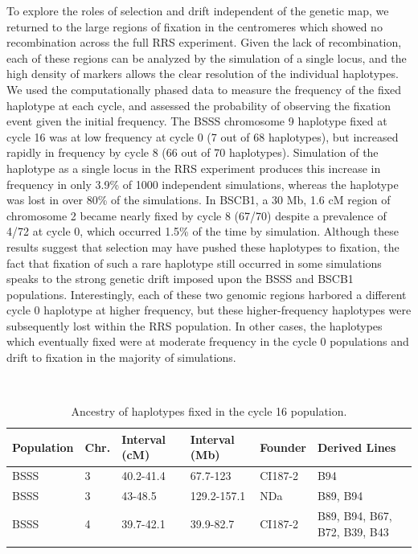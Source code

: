 To explore the roles of selection and drift independent of the genetic map, we returned to the large regions of fixation in the centromeres which showed no recombination across the full RRS experiment. 
Given the lack of recombination, each of these regions can be analyzed by the simulation of a single locus, and the high density of markers allows the clear resolution of the individual haplotypes. 
We used the computationally phased data to measure the frequency of the fixed haplotype at each cycle, and assessed the probability of observing the fixation event given the initial frequency. 
The BSSS chromosome 9 haplotype fixed at cycle 16 was at low frequency at cycle 0 (7 out of 68 haplotypes), but increased rapidly in frequency by cycle 8 (66 out of 70 haplotypes). 
Simulation of the haplotype as a single locus in the RRS experiment produces this increase in frequency in only 3.9\% of 1000 independent simulations, whereas the haplotype was lost in over 80\% of the simulations. 
In BSCB1, a 30 Mb, 1.6 cM region of chromosome 2 became nearly fixed by cycle 8 (67/70) despite a prevalence of 4/72 at cycle 0, which occurred 1.5\% of the time by simulation. 
Although these results suggest that selection may have pushed these haplotypes to fixation, the fact that fixation of such a rare haplotype still occurred in some simulations speaks to the strong genetic drift imposed upon the BSSS and BSCB1 populations.   
Interestingly, each of these two genomic regions harbored a different cycle 0 haplotype at higher frequency, but these higher-frequency haplotypes were subsequently lost within the RRS population. 
In other cases, the haplotypes which eventually fixed were at moderate frequency in the cycle 0 populations and drift to fixation in the majority of simulations.


\renewcommand{\arraystretch}{1.1}
\begin{table}[tb]

\begin{center}
\caption{Ancestry of haplotypes fixed in the cycle 16 population.}
  \textbf{}\\[-2mm]
{\fontsize{6}{9}\sf
\begin{tabular}{llllll}

Population &	 Chr.& Interval (cM) & Interval (Mb) &	Founder & Derived Lines \\
 \hline
BSSS &3	&40.2-41.4	&67.7-123	&CI187-2&	B94  \\
BSSS&	3	&43-48.5&	129.2-157.1	&NDa	&B89, B94 \\
BSSS	&4	&39.7-42.1	&39.9-82.7&	CI187-2	&B89, B94, B67, B72, B39, B43\\
   
 &  &  &  &  &   \\ 
    \hline
    \end{tabular}
    \label{tabfix}
}
\end{center}
\end{table}
\renewcommand{\arraystretch}{1}







